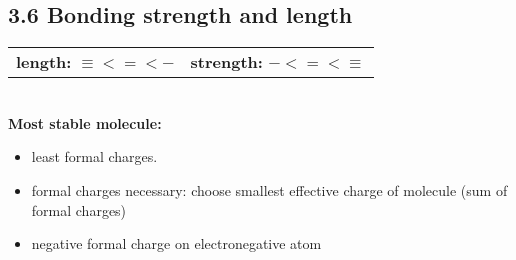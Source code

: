 \subsection{3.6 Bonding strength and length}
    \begin{tabular}{c c}
        \textbf{length:} $\equiv < = < -$ & \textbf{strength:} $- < = < \equiv$\\
    \end{tabular}
    \vspace*{0.5em}\\
    \textbf{Most stable molecule:}
    \begin{itemize}
        \itemsep0em
        \item least formal charges.
        \item formal charges necessary: choose smallest effective charge of molecule (sum of formal charges)
        \item negative formal charge on electronegative atom
    \end{itemize}